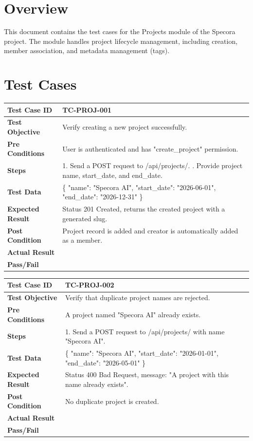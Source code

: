 \section{Overview}
This document contains the test cases for the Projects module of the Specora project. The module handles project lifecycle management, including creation, member association, and metadata management (tags).

\section{Test Cases}

\begin{longtable}{|p{}|p{}|}
\hline
\textbf{Test Case ID} & TC-PROJ-001 \\ \hline
\textbf{Test Objective} & Verify creating a new project successfully. \\ \hline
\textbf{Pre Conditions} & User is authenticated and has "create_project" permission. \\ \hline
\textbf{Steps} & 
1. Send a POST request to /api/projects/. \newline
2. Provide project name, start\_date, and end\_date. \\ \hline
\textbf{Test Data} & \{ "name": "Specora AI", "start\_date": "2026-06-01", "end\_date": "2026-12-31" \} \\ \hline
\textbf{Expected Result} & Status 201 Created, returns the created project with a generated slug. \\ \hline
\textbf{Post Condition} & Project record is added and creator is automatically added as a member. \\ \hline
\textbf{Actual Result} &  \\ \hline
\textbf{Pass/Fail} &  \\ \hline
\end{longtable}

\begin{longtable}{|p{}|p{}|}
\hline
\textbf{Test Case ID} & TC-PROJ-002 \\ \hline
\textbf{Test Objective} & Verify that duplicate project names are rejected. \\ \hline
\textbf{Pre Conditions} & A project named "Specora AI" already exists. \\ \hline
\textbf{Steps} & 
1. Send a POST request to /api/projects/ with name "Specora AI". \\ \hline
\textbf{Test Data} & \{ "name": "Specora AI", "start\_date": "2026-01-01", "end\_date": "2026-05-01" \} \\ \hline
\textbf{Expected Result} & Status 400 Bad Request, message: "A project with this name already exists". \\ \hline
\textbf{Post Condition} & No duplicate project is created. \\ \hline
\textbf{Actual Result} &  \\ \hline
\textbf{Pass/Fail} &  \\ \hline
\end{longtable}

